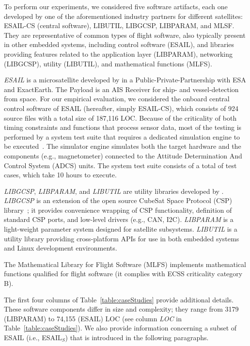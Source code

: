 To perform our experiments, we considered five software artifacts, each one developed by one of the aforementioned industry partners for different satellites: ESAIL-CS (central software), LIBUTIL, LIBGCSP, LIBPARAM, and MLSF.
They are representative of common types of flight software, also typically present in other embedded systems,   including control software (ESAIL), and libraries providing features related to the application layer (LIBPARAM), networking (LIBGCSP), utility (LIBUTIL), and mathematical functions (MLFS).


\emph{ESAIL} is a microsatellite developed by \LXS{}  in a Public-Private-Partnership with ESA and ExactEarth. The Payload is an AIS Receiver for ship- and vessel-detection from space. 
For our empirical evaluation, we considered the onboard central control software of ESAIL (hereafter, simply ESAIL-CS), which consists of 924 source files with a total size of 187,116 LOC. Because of the criticality of both timing constraints and functions that process sensor data, most of the testing is performed by a system test suite that requires a dedicated simulation engine to be executed~\cite{Isasi2019}. The simulator engine  simulates both the target hardware and the components (e.g., magnetometer) connected to the Attitude Determination And Control System (ADCS) units.
The system test suite consists of a total of  test cases, which take 10 hours to execute.

\emph{LIBGCSP}, \emph{LIBPARAM}, and \emph{LIBUTIL}  are utility libraries developed by \GSL.
\emph{LIBGCSP} is an extension of the open source CubeSat Space Protocol (CSP) library~\cite{CSP}; it provides convenience wrapping of CSP functionality,
definition of standard CSP ports, and low-level drivers (e.g., CAN, I2C).
\emph{LIBPARAM} is a light-weight parameter system designed for \GSL satellite subsystems. 
\emph{LIBUTIL} is a utility library providing cross-platform APIs for use in both embedded systems and Linux development environments.

 
The Mathematical Library for Flight Software
(MLFS)
implements mathematical functions qualified for flight software (it complies with ECSS criticality category B).
 
The first four columns of Table~\ref{table:caseStudies} provide additional details.  
These software components differ in size and complexity; they range from 3179 (LIBPARAM) to 74,155 (ESAIL) LOC (see column \emph{LOC} in Table~\ref{table:caseStudies}). We also provide information concerning a subset of ESAIL (i.e., ESAIL$_S$) that is introduced in the following paragraphs.

